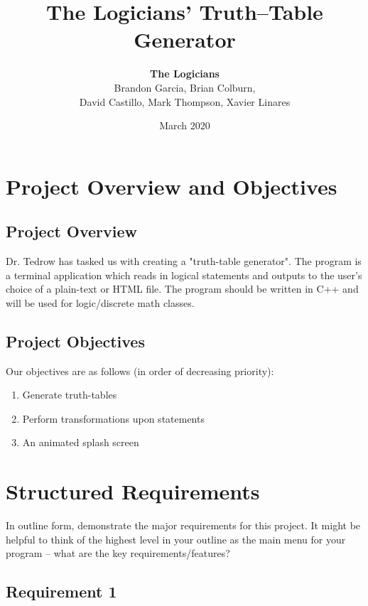 \documentclass{article}
\title{The Logicians' Truth--Table Generator}
\author{\textbf{The Logicians}\\Brandon Garcia, Brian Colburn,\\ David Castillo, Mark Thompson, Xavier Linares}
\date{March 2020}
\begin{document}
\setlength{\parindent}{0pt}

\begin{titlingpage}
\maketitle
\end{titlingpage}

\tableofcontents
\pagebreak

\section{Project Overview and Objectives}
\subsection{Project Overview}
Dr. Tedrow has tasked us with creating a "truth-table generator". The program is a terminal application which reads in logical statements and outputs to the user's choice of a plain-text or HTML file. The program should be written in C++ and will be used for logic/discrete math classes.


\subsection{Project Objectives}

Our objectives are as follows (in order of decreasing priority):
\begin{enumerate}
 \item Generate truth-tables
 \item Perform transformations upon statements
 \tiny \item An animated splash screen
\end{enumerate}


\section{Structured Requirements}

In outline form, demonstrate the major requirements for this project. It might be helpful to think of the highest level in your outline as the main menu for your program -- what are the key requirements/features?

\subsection{Requirement 1}
\end{document}
